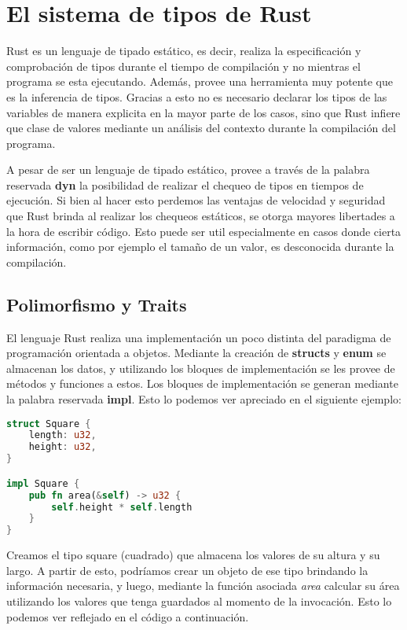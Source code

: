 \chapter{El sistema de tipos de Rust}

Rust es un lenguaje de tipado estático, es decir, realiza la especificación y comprobación de tipos durante el tiempo de compilación y no mientras el programa se esta ejecutando. Además, provee una herramienta muy potente que es la inferencia de tipos. Gracias a esto no es necesario declarar los tipos de las variables de manera explicita en la mayor parte de los casos, sino que Rust infiere que clase de valores mediante un análisis del contexto durante la compilación del programa.

A pesar de ser un lenguaje de tipado estático, provee a través de la palabra reservada \textbf{dyn} la posibilidad de realizar el chequeo de tipos en tiempos de ejecución. Si bien al hacer esto perdemos las ventajas de velocidad y seguridad que Rust brinda al realizar los chequeos estáticos, se otorga mayores libertades a la hora de escribir código. Esto puede ser util especialmente en casos donde cierta información, como por ejemplo el tamaño de un valor, es desconocida durante la compilación.

\section{Polimorfismo y Traits}

El lenguaje Rust realiza una implementación un poco distinta del paradigma de programación orientada a objetos. Mediante la creación de \textbf{structs} y \textbf{enum} se almacenan los datos, y utilizando los bloques de implementación se les provee de métodos y funciones a estos. Los bloques de implementación se generan mediante la palabra reservada \textbf{impl}. Esto lo podemos ver apreciado en el siguiente ejemplo:

\begin{lstlisting}[language=Rust]
struct Square {
    length: u32,
    height: u32,
}

impl Square {
    pub fn area(&self) -> u32 {
        self.height * self.length
    }
}
\end{lstlisting}

Creamos el tipo square (cuadrado) que almacena los valores de su altura y su largo. A partir de esto, podríamos crear un objeto de ese tipo brindando la información necesaria, y luego, mediante la función asociada \textit{area} calcular su área utilizando los valores que tenga guardados al momento de la invocación. Esto lo podemos ver reflejado en el código a continuación.

